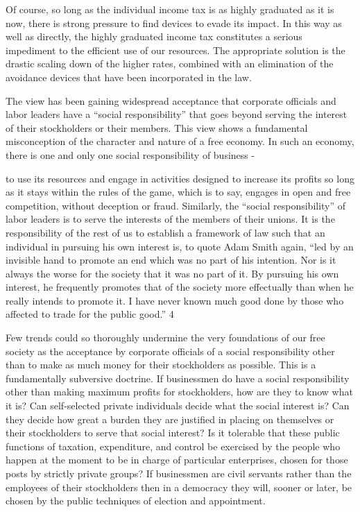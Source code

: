 \documentclass[11pt,openany]{book}
\begin{document}
Of course, so long as the individual income tax is as highly graduated as it is now, there is strong pressure to find devices to evade its impact. In this way as well as directly, the highly graduated income tax constitutes a serious impediment to the efficient use of our resources. The appropriate solution is the drastic scaling down of the higher rates, combined with an elimination of the avoidance devices that have been incorporated in the law.

The view has been gaining widespread acceptance that corporate officials and labor leaders have a ``social responsibility'' that goes beyond serving the interest of their stockholders or their members. This view shows a fundamental misconception of the character and nature of a free economy. In such an economy, there is one and only one social responsibility of business -

to use its resources and engage in activities designed to increase its profits so long as it stays within the rules of the game, which is to say, engages in open and free competition, without deception or fraud. Similarly, the ``social responsibility'' of labor leaders is to serve the interests of the members of their unions. It is the responsibility of the rest of us to establish a framework of law such that an individual in pursuing his own interest is, to quote Adam Smith again, ``led by an invisible hand to promote an end which was no part of his intention. Nor is it always the worse for the society that it was no part of it. By pursuing his own interest, he frequently promotes that of the society more effectually than when he really intends to promote it. I have never known much good done by those who affected to trade for the public good.'' 4

Few trends could so thoroughly undermine the very foundations of our free society as the acceptance by corporate officials of a social responsibility other than to make as much money for their stockholders as possible. This is a fundamentally subversive doctrine. If businessmen do have a social responsibility other than making maximum profits for stockholders, how are they to know what it is? Can self-selected private individuals decide what the social interest is? Can they decide how great a burden they are justified in placing on themselves or their stockholders to serve that social interest? Is it tolerable that these public functions of taxation, expenditure, and control be exercised by the people who happen at the moment to be in charge of particular enterprises, chosen for those posts by strictly private groups? If businessmen are civil servants rather than the employees of their stockholders then in a democracy they will, sooner or later, be chosen by the public techniques of election and appointment.
\end{document}
